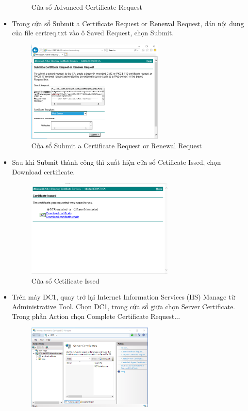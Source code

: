 \documentclass[13pt]{report}
\begin{document}
\begin{itemize}
\begin{figure}[htp]
			\caption{Cửa sổ Advanced Certificate Request}
		\end{figure}
		\newpage
		\item Trong cửa sổ Submit a Certificate Request or Renewal Request, dán nội dung của file certreq.txt vào ô Saved Request, chọn Submit.
		\begin{figure}[htp]
			\centering
			\includegraphics[width=0.65\textwidth]{image/Gui/SSL/12.png}
			\caption{Cửa sổ Submit a Certificate Request or Renewal Request}
		\end{figure}
		\item Sau khi Submit thành công thì xuất hiện cửa sổ Cetificate Issed, chọn Download certificate.
		\begin{figure}[htp]
			\centering
			\includegraphics[width=0.7\textwidth]{image/Gui/SSL/13.png}
			\caption{Cửa sổ Cetificate Issed}
		\end{figure}
		\newpage
		\item Trên máy DC1, quay trở lại Internet Information Services (IIS) Manage từ Administrative Tool. Chọn DC1, trong cửa sổ giữa chọn Server Certificate. Trong phần Action chọn Complete Certificate Request...
		\begin{figure}[htp]
			\centering
			\includegraphics[width=0.6\textwidth]{image/Gui/SSL/14.png}

\end{figure}
\end{itemize}
\end{document}
